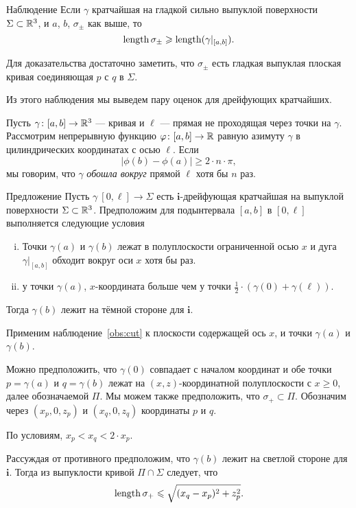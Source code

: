 \documentclass[a4paper,10pt]{article}
\begin{document}
\begin{thm}{Наблюдение}\label{obs:cut}
Если $\gamma$ кратчайшая на гладкой сильно выпуклой поверхности $\Sigma\subset \mathbb{R}^3$, и $a$, $b$, $\sigma_\pm$ как выше, то
\[\mathop{\rm length}\nolimits\sigma_\pm\geqslant\mathop{\rm length}\nolimits(\gamma|_{[a,b]}).\]
\end{thm}

Для доказательства достаточно заметить, что $\sigma_\pm$ есть гладкая выпуклая плоская кривая соединяющая $p$ с $q$ в $\Sigma$.

Из этого наблюдения мы выведем пару оценок для дрейфующих кратчайших.

Пусть $\gamma\colon[a,b]\to\mathbb{R}^3$ --- кривая и $\ell$ --- прямая не проходящая через точки на $\gamma$.
Рассмотрим непрерывную функцию $\varphi\colon[a,b]\to\mathbb{R}$ равную азимуту $\gamma$ в цилиндрических координатах с осью $\ell$.
Если
\[|\phi(b)-\phi(a)|\ge 2\cdot n\cdot\pi,\]
мы говорим, что  $\gamma$ \emph{обошла вокруг} прямой $\ell$ хотя бы $n$ раз.

\begin{thm}{Предложение}\label{prop:around-once}
Пусть $\gamma\:[0,\ell]\to \Sigma$ есть $\bm{i}$-дрейфующая кратчайшая на выпуклой поверхности $\Sigma\subset \mathbb{R}^3$. Предположим для подынтервала $[a,b]$ в $[0,\ell]$ выполняется следующие условия
\begin{enumerate}[(i)]
\item Точки $\gamma(a)$ и $\gamma(b)$ лежат в полуплоскости ограниченной осью $x$ 
и дуга $\gamma|_{[a,b]}$ обходит вокруг оси $x$ хотя бы раз.
\item  у точки $\gamma(a)$, $x$-координата больше чем у точки $\tfrac12\cdot(\gamma(0)+\gamma(\ell))$.
\end{enumerate}
Тогда  $\gamma(b)$ лежит на тёмной стороне для $\bm{i}$.
\end{thm}

Применим наблюдение~\ref{obs:cut} к плоскости содержащей ось $x$, и точки $\gamma(a)$ и $\gamma(b)$.


Можно предположить, что $\gamma(0)$ совпадает с началом координат 
и обе точки $p=\gamma(a)$ и $q=\gamma(b)$ лежат на $(x,z)$-координатной полуплоскости с $x\ge 0$, далее обозначаемой $\Pi$.
Мы можем также предположить, что $\sigma_+\subset \Pi$.
Обозначим через $(x_p,0,z_p)$ и $(x_q,0,z_q)$ координаты $p$ и $q$.

По условиям, $x_p<x_q<2\cdot x_p$.

Рассуждая от противного предположим, что $\gamma(b)$ лежит на светлой стороне для $\bm{i}$.
Тогда из выпуклости кривой $\Pi\cap \Sigma$
следует, что 
\[\mathop{\rm length}\nolimits\sigma_+\leqslant \sqrt{(x_q-x_p)^2+z_p^2}.\]
\end{document}
